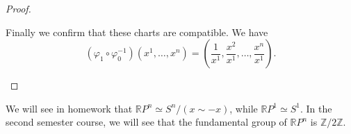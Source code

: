 \begin{xmpl}
\begin{proof}
\begin{enumerate}
{      Finally we confirm that these charts are compatible. We have
      $$
        (\varphi_1 \circ \varphi_0^{-1})(x^1, \dots, x^n)
      = \left(\frac{1}{x^1}, \frac{x^2}{x^1}, \dots, \frac{x^n}{x^1}\right).
      $$
    }
  \end{enumerate}
\end{proof}

We will see in homework that $\mathbb{R}P^n \simeq S^n / (x \sim -x)$,
while $\mathbb{R} P^1 \simeq S^1$. In the second semester course, we
will see that the fundamental group of $\mathbb{R} P^n$ is
$\mathbb{Z} / 2\mathbb{Z}$.

\end{xmpl}
